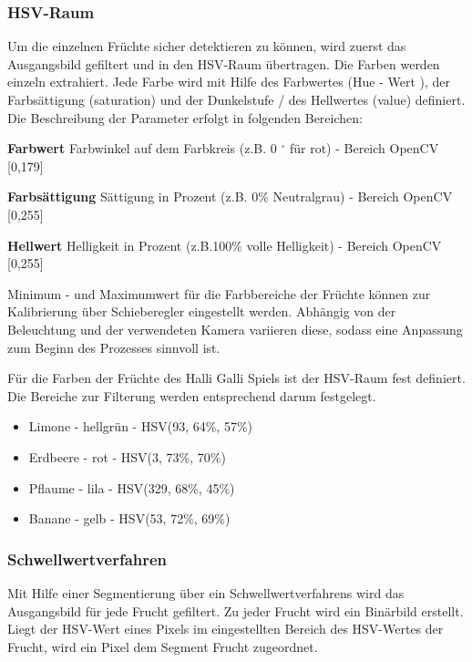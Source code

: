 \subsubsection{HSV-Raum}

Um die einzelnen Früchte sicher detektieren zu können, wird zuerst das Ausgangsbild gefiltert und in den HSV-Raum übertragen. Die Farben werden einzeln extrahiert. Jede Farbe wird mit Hilfe des Farbwertes (Hue - Wert ), der Farbsättigung (saturation) und der Dunkelstufe / des Hellwertes (value) definiert. Die Beschreibung der Parameter erfolgt in folgenden Bereichen:

\textbf{Farbwert} Farbwinkel auf dem Farbkreis (z.B. 0 $^\circ$ für rot) - Bereich OpenCV [0,179]

\textbf{Farbsättigung} Sättigung in Prozent (z.B. 0\% Neutralgrau) - Bereich OpenCV [0,255]

\textbf{Hellwert} Helligkeit in Prozent (z.B.100\% volle Helligkeit) - Bereich OpenCV [0,255]

Minimum - und Maximumwert für die Farbbereiche der Früchte können zur Kalibrierung über Schieberegler eingestellt werden. Abhängig von der Beleuchtung und der verwendeten Kamera variieren diese, sodass eine Anpassung zum Beginn des Prozesses sinnvoll ist. 

Für die Farben der Früchte des Halli Galli Spiels ist der HSV-Raum fest definiert. Die Bereiche zur Filterung werden entsprechend darum festgelegt. 

\begin{itemize}
    \item Limone - hellgrün - HSV(93, 64\%, 57\%)
    \item Erdbeere - rot - HSV(3, 73\%, 70\%)
    \item Pflaume - lila - HSV(329, 68\%, 45\%)
    \item Banane - gelb - HSV(53, 72\%, 69\%)
  
\end{itemize}

\subsubsection{Schwellwertverfahren}

Mit Hilfe einer Segmentierung über ein Schwellwertverfahrens wird das Ausgangsbild für jede Frucht gefiltert. Zu jeder Frucht wird ein Binärbild erstellt. Liegt der HSV-Wert eines Pixels im eingestellten Bereich des HSV-Wertes der Frucht, wird ein Pixel dem Segment Frucht zugeordnet. 

